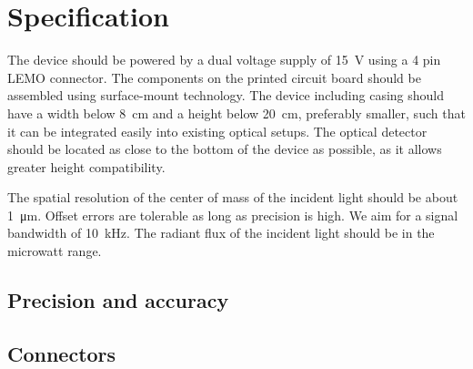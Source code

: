 \section{Specification}

The device should be powered by a dual voltage supply of \SI{15}{\volt} using a 4 pin LEMO connector.
The components on the printed circuit board should be assembled using surface-mount technology.
The device including casing should have a width below \SI{8}{\centi\meter} and a height below \SI{20}{\centi\meter}, preferably smaller, such that it can be integrated easily into existing optical setups.
The optical detector should be located as close to the bottom of the device as possible, as it allows greater height compatibility.

The spatial resolution of the center of mass of the incident light should be about \SI{1}{\micro\meter}.
Offset errors are tolerable as long as precision is high.
We aim for a signal bandwidth of \SI{10}{\kilo\hertz}.
The radiant flux of the incident light should be in the microwatt range.

\subsection{Precision and accuracy}

\subsection{Connectors}
